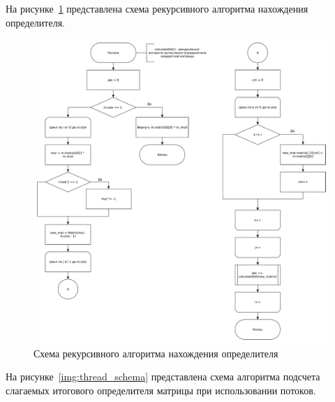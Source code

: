 \documentclass[a4paper,oneside,14pt]{extreport}
\begin{document}
На рисунке~\ref{img:count_det} представлена схема рекурсивного алгоритма нахождения определителя.
\begin{figure}[H]
	\centering
	\includegraphics[width=1.00\linewidth]{images/count_det}
	\caption{Схема рекурсивного алгоритма нахождения определителя}
	\label{img:count_det}
\end{figure}

На рисунке~\ref{img:thread_schema} представлена схема алгоритма подсчета слагаемых итогового определителя матрицы
при использовании потоков.
\end{document}
